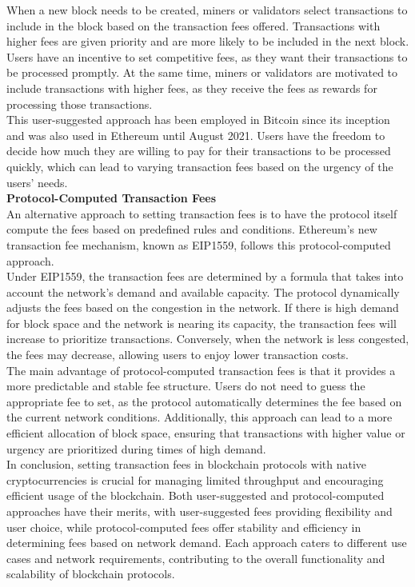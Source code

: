 When a new block needs to be created, miners or validators select transactions to include in the block based on the transaction fees offered. Transactions with higher fees are given priority and are more likely to be included in the next block. Users have an incentive to set competitive fees, as they want their transactions to be processed promptly. At the same time, miners or validators are motivated to include transactions with higher fees, as they receive the fees as rewards for processing those transactions.\\

This user-suggested approach has been employed in Bitcoin since its inception and was also used in Ethereum until August 2021. Users have the freedom to decide how much they are willing to pay for their transactions to be processed quickly, which can lead to varying transaction fees based on the urgency of the users' needs.\\

\noindent
\textbf{Protocol-Computed Transaction Fees}\\
An alternative approach to setting transaction fees is to have the protocol itself compute the fees based on predefined rules and conditions. Ethereum's new transaction fee mechanism, known as EIP1559, follows this protocol-computed approach.\\

Under EIP1559, the transaction fees are determined by a formula that takes into account the network's demand and available capacity. The protocol dynamically adjusts the fees based on the congestion in the network. If there is high demand for block space and the network is nearing its capacity, the transaction fees will increase to prioritize transactions. Conversely, when the network is less congested, the fees may decrease, allowing users to enjoy lower transaction costs.\\

The main advantage of protocol-computed transaction fees is that it provides a more predictable and stable fee structure. Users do not need to guess the appropriate fee to set, as the protocol automatically determines the fee based on the current network conditions. Additionally, this approach can lead to a more efficient allocation of block space, ensuring that transactions with higher value or urgency are prioritized during times of high demand.\\

In conclusion, setting transaction fees in blockchain protocols with native cryptocurrencies is crucial for managing limited throughput and encouraging efficient usage of the blockchain. Both user-suggested and protocol-computed approaches have their merits, with user-suggested fees providing flexibility and user choice, while protocol-computed fees offer stability and efficiency in determining fees based on network demand. Each approach caters to different use cases and network requirements, contributing to the overall functionality and scalability of blockchain protocols.

